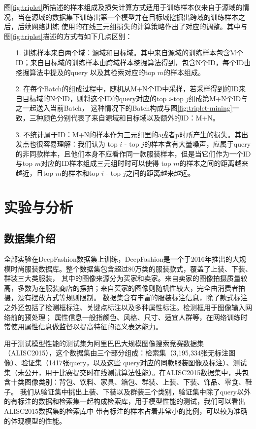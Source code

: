 图\ref{fig:triplet}所描述的样本组成及损失计算方式适用于训练样本仅来自于源域的情况，当在源域的数据集下训练出第一个模型并在目标域挖掘出跨域的训练样本之后，后续网络训练
使用的在线三元组损失的计算策略作出了对应的调整。其中与图\ref{fig:triplet}描述的方式有如下几点区别：
\begin{itemize}
  \item[1.]训练样本来自两个域：源域和目标域。其中来自源域的训练样本包含M个ID；来自目标域的训练样本由跨域样本挖掘算法得到，包含N个ID，每个ID由挖掘算法中提及的query
    以及其检索对应的top $m$的样本组成。
  \item[2.]在每个Batch的组成过程中，随机从M+N个ID中采样，若采样得到的ID来自目标域的N个ID，则将这个ID的query对应的top $i$-top $j$组成第M+N个ID与之一起送入当前Batch，
    这种情况下的Batch构成与图\ref{fig:triplet-mining}一致，三种颜色分别代表了来自源域和目标域以及额外的ID：M+N。
  \item[3.]不统计属于ID：M+N的样本作为三元组里的a或者p时所产生的损失。其出发点也很容易理解：我们认为
    top $i$ - top $j$的样本含有大量噪声，应属于query的非同款样本，且他们本身不应看作同一款服装样本，但是当它们作为一个ID与top $m$对应的ID样本组成三元组时时可以使得
    top $m$的样本之间的距离越来越近，且top $m$的样本和top $i$ - top $j$之间的距离越来越远。
\end{itemize}


\section{实验与分析}
\subsection{数据集介绍}
全部实验在DeepFashion数据集上训练，DeepFashion是一个于2016年推出的大规模时尚服装数据库。整个数据集包含超过80万类的服装款式，覆盖了上装、下装、群装三大类服装，
其中的图像来源分为买家和卖家。来自卖家的图像拍摄质量较高，多数为在服装商店的摆拍；来自买家的图像则随机性较大，完全由消费者拍摄，没有摆放方式等规则限制。
数据集含有丰富的服装标注信息，除了款式标注之外还包括了检测框标注、关键点标注以及多种属性标注。检测框用于图像输入网络前的预处理；
属性信息一般指颜色、风格、尺寸、适宜人群等，在网络训练时常使用属性信息做监督以提高特征的语义表达能力。


用于测试模型性能的测试集为阿里巴巴大规模图像搜索竞赛数据集（ALISC2015），这个数据集由三个部分组成：检索集（3,195,334张无标注图像）、验证集（1417张query，以及这些
query对应的同款服装图像及标注）、测试集（未公开，用于比赛提交时在线测试算法性能）。在ALISC2015数据集中，共包含十类图像类别：背包、饮料、家具、箱包、群装、上装、下装、饰品、零食、鞋子。
我们从验证集中挑出上装、下装以及群装三个类别，验证集中除了query以外的有标注的数据和检索集一起构成检索库，用于模型性能的测试，我们可以看出ALISC2015数据集的检索库中
带有标注的样本占着非常小的比例，可以较为准确的体现模型的性能。

